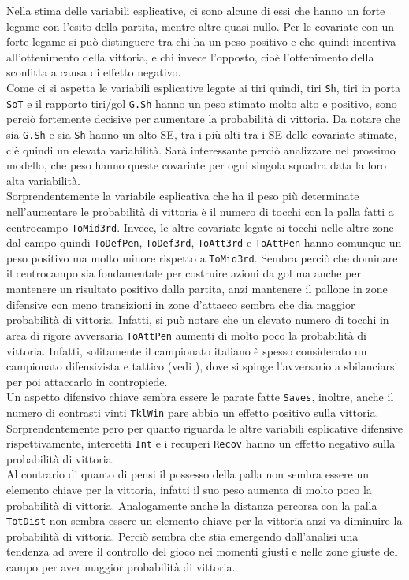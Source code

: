 Nella stima delle variabili esplicative, ci sono alcune di essi che hanno un forte legame con l'esito della partita, mentre altre quasi nullo. Per le covariate con un forte legame si può distinguere tra chi ha un peso positivo e che quindi incentiva all'ottenimento della vittoria, e chi invece l'opposto, cioè l'ottenimento della sconfitta a causa di effetto negativo.\\
Come ci si aspetta le variabili esplicative legate ai tiri quindi, tiri \texttt{Sh}, tiri in porta \texttt{SoT} e il rapporto tiri/gol \texttt{G.Sh} hanno un peso stimato molto alto e positivo, sono perciò fortemente decisive per aumentare la probabilità di vittoria. Da notare che sia \texttt{G.Sh} e sia \texttt{Sh} hanno un alto SE, tra i più alti tra i SE delle covariate stimate, c'è quindi un elevata variabilità. Sarà interessante perciò analizzare nel prossimo modello, che peso hanno queste covariate per ogni singola squadra data la loro alta variabilità.\\
Sorprendentemente la variabile esplicativa che ha il peso più determinate nell'aumentare le probabilità di vittoria è il numero di tocchi con la palla fatti a centrocampo \texttt{ToMid3rd}. Invece, le altre covariate legate ai tocchi nelle altre zone dal campo quindi \texttt{ToDefPen}, \texttt{ToDef3rd}, \texttt{ToAtt3rd} e \texttt{ToAttPen} hanno comunque un peso positivo ma molto minore rispetto a \texttt{ToMid3rd}. Sembra perciò che dominare il centrocampo sia fondamentale per costruire azioni da gol ma anche per mantenere un risultato positivo dalla partita, anzi mantenere il pallone in zone difensive con meno transizioni in zone d'attacco sembra che dia maggior probabilità di vittoria. Infatti, si può notare che un elevato numero di tocchi in area di rigore avversaria \texttt{ToAttPen} aumenti di molto poco la probabilità di vittoria. Infatti, solitamente il campionato italiano è spesso considerato un campionato difensivista e tattico (vedi \textit{\cite{site:speculazione}}), dove si spinge l'avversario a sbilanciarsi per poi attaccarlo in contropiede.\\
Un aspetto difensivo chiave sembra essere le parate fatte \texttt{Saves}, inoltre, anche il numero di contrasti vinti \texttt{TklWin} pare abbia un effetto positivo sulla vittoria. Sorprendentemente pero per quanto riguarda le altre variabili esplicative difensive rispettivamente, intercetti \texttt{Int} e i recuperi \texttt{Recov} hanno un effetto negativo sulla probabilità di vittoria. \\
Al contrario di quanto di pensi il possesso della palla non sembra essere un elemento chiave per la vittoria, infatti il suo peso aumenta di molto poco la probabilità di vittoria. Analogamente anche la distanza percorsa con la palla \texttt{TotDist} non sembra essere un elemento chiave per la vittoria anzi va diminuire la probabilità di vittoria. Perciò sembra che stia emergendo dall'analisi una tendenza ad avere il controllo del gioco nei momenti giusti e nelle zone giuste del campo per aver maggior probabilità di vittoria.\\
